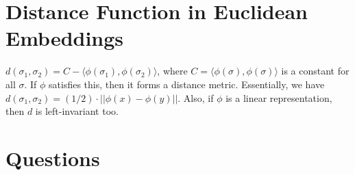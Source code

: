 \documentclass[10pt,letterpaper]{article}
\begin{document}
\section{Distance Function in Euclidean Embeddings}
\label{sec:dist}

$d(\sigma_1,\sigma_2) = C-\langle \phi(\sigma_1),\phi(\sigma_2) \rangle$, where $C = \langle \phi(\sigma),\phi(\sigma) \rangle$ is a constant for all $\sigma$. If $\phi$ satisfies this, then it forms a distance metric. Essentially, we have $d(\sigma_1,\sigma_2) = (1/2) \cdot ||\phi(x)-\phi(y)||$. Also, if $\phi$ is a linear representation, then $d$ is left-invariant too. 


\section{Questions}
\end{document}
